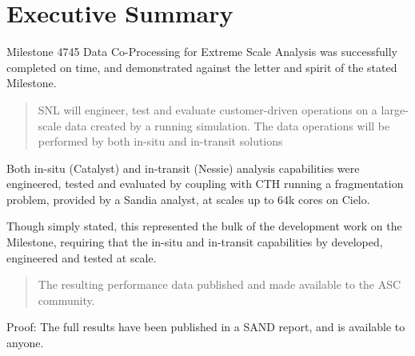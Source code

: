 \section*{Executive Summary}

Milestone 4745 Data Co-Processing for Extreme Scale Analysis was successfully completed on time, and demonstrated against the letter and spirit of the stated Milestone.

\begin{quote}
\begin{em}
SNL will engineer, test and evaluate customer-driven operations on a large-scale data created by a running simulation.  The data operations will be performed by both in-situ and in-transit solutions
\end{em}
\end{quote}

Both in-situ (Catalyst) and in-transit (Nessie) analysis capabilities were engineered, tested and evaluated by coupling with CTH running a fragmentation problem, provided by a Sandia analyst, at scales up to 64k cores on Cielo.

Though simply stated, this represented the bulk of the development work on the Milestone, requiring that the in-situ and in-transit capabilities by developed, engineered and tested at scale. 

\begin{quote}
\begin{em}
The resulting performance data published and made available to the ASC community.
\end{em}
\end{quote}

Proof:  The full results have been published in a SAND report, and is available to anyone.

